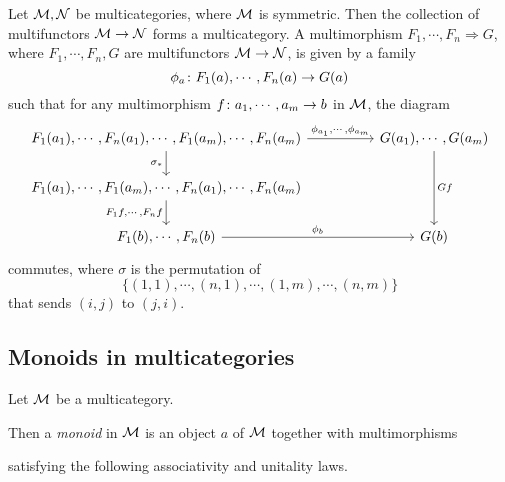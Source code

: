 \documentclass{article}
\begin{document}
\begin{definition}
  Let $\mathcal M,\mathcal N$ be multicategories, where $\mathcal M$ is symmetric.  
  Then the collection of multifunctors $\mathcal M\to\mathcal N$ forms a multicategory.  
  A multimorphism $F_1,\cdots,F_n\Rightarrow G$, where $F_1,\cdots,F_n,G$ are multifunctors $\mathcal M\to \mathcal N$, is given by a family
  \[
    \phi_a \colon F_1(a),\cdots,F_n(a) \to G(a)
    \]
  such that for any multimorphism $f\colon a_1,\cdots,a_m\to b$ in $\mathcal M$, the diagram
  \[
    \begin{tikzcd}[column sep=48pt]
      F_1(a_1),\cdots,F_n(a_1),\cdots,F_1(a_m),\cdots,F_n(a_m) \arrow[r, "{\phi_{a_1},\cdots,\phi_{a_m}}"] \arrow[d, "\sigma_*"']
        & G(a_1),\cdots,G(a_m) \arrow[dd, "Gf"] \\
      F_1(a_1),\cdots,F_1(a_m),\cdots,F_n(a_1),\cdots,F_n(a_m) \arrow[d, "{F_1f,\cdots,F_nf}"']
        & \\
      F_1(b),\cdots,F_n(b) \arrow[r, "\phi_b"]
        & G(b)
    \end{tikzcd}
    \]
  commutes, where $\sigma$ is the permutation of
  \[
    \{(1,1),\cdots,(n,1),\cdots,(1,m),\cdots,(n,m)\}
    \]
  that sends $(i,j)$ to $(j,i)$.
\end{definition}

\subsection{Monoids in multicategories}

\begin{definition}
  \label{DefMonoidMulticategory}
Let $\mathcal M$ be a multicategory.  

  Then a \emph{monoid} in $\mathcal M$ is an object $a$ of $\mathcal M$ together with multimorphisms
  satisfying the following associativity and unitality laws.
\end{definition}
\end{document}
